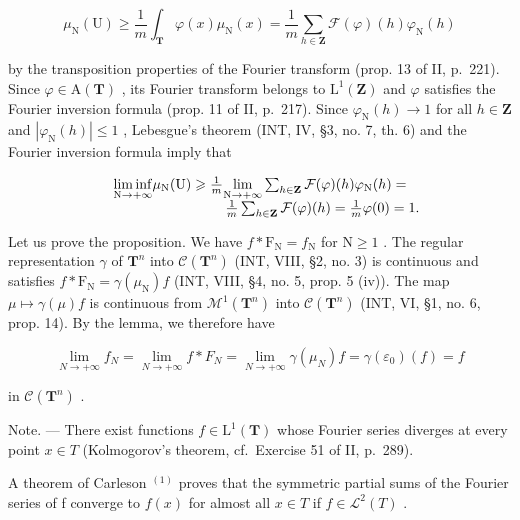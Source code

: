 \[
\mu_ {\mathrm{N}} (\mathrm{U}) \geqslant \frac {1}{m} \int_ {\mathbf {T}} \varphi (x) \mu_ {\mathrm{N}} (x) = \frac {1}{m} \sum_ {h \in \mathbf {Z}} \mathcal {F} (\varphi) (h) \varphi_ {\mathrm{N}} (h)
\]

by the transposition properties of the Fourier transform (prop. 13 of II, p.~221). Since \(\varphi \in \mathrm{A}(\mathbf{T})\) , its Fourier transform belongs to \(\mathrm{L}^1 (\mathbf{Z})\) and \(\varphi\) satisfies the Fourier inversion formula (prop. 11 of II, p.~217). Since \(\varphi_{\mathrm{N}}(h)\to 1\) for all \(h\in \mathbf{Z}\) and \(|\varphi_{\mathrm{N}}(h)|\leqslant 1\) , Lebesgue's theorem (INT, IV, §3, no. 7, th. 6) and the Fourier inversion formula imply that

\[
\begin{array}{r l} & {\underset {\mathrm{N} \to + \infty} {\liminf} \mu_ {\mathrm{N}} (\mathrm{U}) \geqslant \frac {1}{m} \underset {\mathrm{N} \to + \infty} {\lim} \sum_ {h \in \mathbf {Z}} \mathcal {F} (\varphi) (h) \varphi_ {\mathrm{N}} (h) =} \\ & {\qquad \qquad \qquad \qquad \frac {1}{m} \sum_ {h \in \mathbf {Z}} \mathcal {F} (\varphi) (h) = \frac {1}{m} \varphi (0) = 1.} \end{array}
\]

Let us prove the proposition. We have \(f * \mathrm{F}_{\mathrm{N}} = f_{\mathrm{N}}\) for \(\mathrm{N} \geqslant 1\) . The regular representation \(\gamma\) of \(\mathbf{T}^n\) into \(\mathcal{C}(\mathbf{T}^n)\) (INT, VIII, §2, no. 3) is continuous and satisfies \(f * \mathrm{F}_{\mathrm{N}} = \gamma(\mu_{\mathrm{N}})f\) (INT, VIII, §4, no. 5, prop. 5 (iv)). The map \(\mu \mapsto \gamma(\mu)f\) is continuous from \(\mathcal{M}^1(\mathbf{T}^n)\) into \(\mathcal{C}(\mathbf{T}^n)\) (INT, VI, §1, no. 6, prop. 14). By the lemma, we therefore have

\[
\lim _ {N \to + \infty} f _ {N} = \lim _ {N \to + \infty} f * F _ {N} = \lim _ {N \to + \infty} \gamma (\mu_ {N}) f = \gamma (\varepsilon_ {0}) (f) = f
\]

in \(\mathcal{C}(\mathbf{T}^n)\) .

Note. --- There exist functions \(f \in \mathrm{L}^{1}(\mathbf{T})\) whose Fourier series diverges at every point \(x \in T\) (Kolmogorov's theorem, cf.~Exercise 51 of II, p.~289).

A theorem of Carleson \(^{(1)}\) proves that the symmetric partial sums of the Fourier series of f converge to \(f(x)\) for almost all \(x \in T\) if \(f \in \mathcal{L}^{2}(T)\) .

